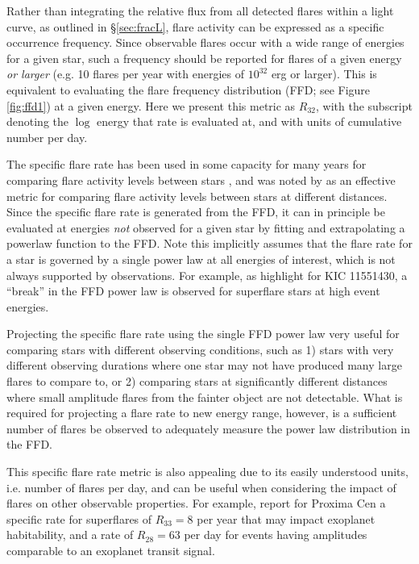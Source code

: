 \documentclass[preprint2]{aastex62}
\begin{document}
Rather than integrating the relative flux from all detected flares within a light curve, as outlined in \S\ref{sec:fracL}, flare activity can be expressed as a specific occurrence frequency. Since observable flares occur with a wide range of energies for a given star, such a frequency should be reported for flares of a given energy {\it or larger} (e.g. 10 flares per year with energies of $10^{32}$ erg or larger). This is equivalent to evaluating the flare frequency distribution (FFD; see Figure \ref{fig:ffd1}) at a given energy. Here we present this metric as $R_{32}$, with the subscript denoting the $\log$ energy that rate is evaluated at, and with units of cumulative number per day.

The specific flare rate has been used in some capacity for many years for comparing flare activity levels between stars \citep[e.g.][]{lme1976}, and was noted by \citet{davenport2016} as an effective metric for comparing flare activity levels between stars at different distances. Since the specific flare rate is generated from the FFD, it can in principle be evaluated at energies {\it not} observed for a given star by fitting and extrapolating a powerlaw function to the FFD. Note this implicitly assumes that the flare rate for a star is governed by a single power law at all energies of interest, which is not always supported by observations. For example, as \citet{davenport2016} highlight for KIC 11551430, a ``break'' in the FFD power law is observed for superflare stars at high event energies. 

Projecting the specific flare rate using the single FFD power law very useful for comparing stars with different observing conditions, such as 1) stars with very different observing durations where one star may not have produced many large flares to compare to, or 2) comparing stars at significantly different distances where small amplitude flares from the fainter object are not detectable. What is required for projecting a flare rate to new energy range, however, is a sufficient number of flares be observed to adequately measure the power law distribution in the FFD.

This specific flare rate metric is also appealing due to its easily understood units, i.e. number of flares per day, and can be useful when considering the impact of flares on other observable properties. For example, \citet{davenport2016b} report for Proxima Cen a specific rate for superflares of $R_{33}=8$ per year that may impact exoplanet habitability, and a rate of $R_{28}=63$ per day for events having amplitudes comparable to an exoplanet transit signal.
\end{document}
